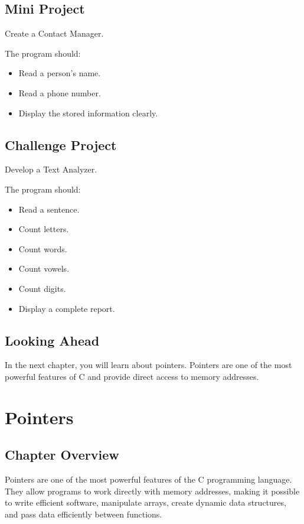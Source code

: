 \documentclass[12pt,openany]{book}
\begin{document}
\section{Mini Project}

Create a Contact Manager.

The program should:

\begin{itemize}
    \item Read a person's name.
    \item Read a phone number.
    \item Display the stored information clearly.
\end{itemize}

\section{Challenge Project}

Develop a Text Analyzer.

The program should:

\begin{itemize}
    \item Read a sentence.
    \item Count letters.
    \item Count words.
    \item Count vowels.
    \item Count digits.
    \item Display a complete report.
\end{itemize}

\section{Looking Ahead}

In the next chapter, you will learn about pointers. Pointers are one of the most powerful features of C and provide direct access to memory addresses.
\chapter{Pointers}

\section{Chapter Overview}

Pointers are one of the most powerful features of the C programming language. They allow programs to work directly with memory addresses, making it possible to write efficient software, manipulate arrays, create dynamic data structures, and pass data efficiently between functions.
\end{document}
